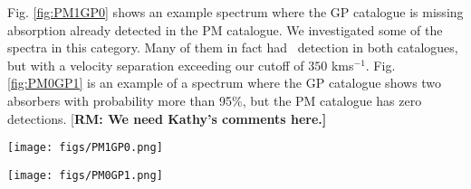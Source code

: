 \documentclass[fleqn,usenatbib]{mnras}
\newcommand{\civ}{\ion{C}{IV}}
\newcommand{\zciv}{z_{\civ}}
\newcommand{\kms}{kms$^{-1}$} %
\newcommand{\zqso}{z_{\textrm{QSO}}}
\newcommand{\rmon}[1]{\textcolor{rez}{[\bf RM: #1]}}
\begin{document}
Fig. \ref{fig:PM1GP0} shows an example spectrum where the GP catalogue
is missing absorption already detected in the PM catalogue. We investigated some of
the spectra in this category. Many of them in fact had \civ\ detection in both
catalogues, but with a velocity separation exceeding our cutoff of $350$ \kms.
Fig. \ref{fig:PM0GP1} is an example of a
spectrum where the GP catalogue shows two absorbers with probability more
than 95\%, but the PM catalogue has zero detections.
\rmon{We need Kathy's comments here.}
\begin{figure*}
  \texttt{[image: figs/PM1GP0.png]}
  \caption{Example of an absorber detected by the PM catalogue, but assigned a relatively low probability (34\%) by the GP catalogue, at $\zciv=1.827$.
The QSO-ID for this spectrum is 52367-0332-585, and the quasar redshift is $1.87$.
The posterior absorption probabilities are
 $P(CIV)=$[1.00, 1.00, 0.34, 0.15], with maximum a posterior absorber redshifts of
 $z_{CIV}$=[1.554, 1.826, 1.820, 1.692], and the rest equivalent widths are REW(GP)=[0.59, 0.88, 0.53, 0.26]\AA.
The PM catalogue reported absorbers at $z_{PM}$=[1.556,1.822,1.827] with
REW(PM)$=[0.88\pm 0.12$, $0.40\pm0.10$, $0.88\pm 0.08$]\AA.}
  \label{fig:PM1GP0}
\end{figure*}
 \begin{figure*}
  \texttt{[image: figs/PM0GP1.png]}
  \caption{Example spectrum with two absorbers found by GP with high probability missed by the PM catalogue.
  QSO-ID is 51994-0309-592 and $\zqso =  2.76$. Probabilities for the total 4 searches are:
 P(CIV)=[1.00, 0.98], the maximum a posteriori absorption redshift values are $z_{CIV}$=[2.288, 2.650],
 and the rest equivalent width from Voigt profile integration are REW(GP)=[0.90, 0.32]\AA.
The PM catalog reports no absorption for this spectrum.}
  \label{fig:PM0GP1}
\end{figure*}



\end{document}
